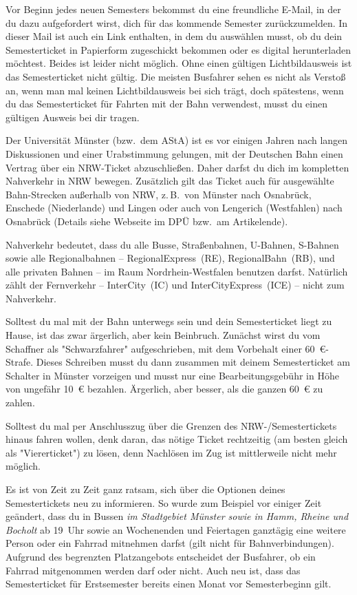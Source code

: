 \begin{multicols*}{2}
Vor Beginn jedes neuen Semesters bekommst du eine freundliche E-Mail, in der du dazu aufgefordert wirst, dich für das kommende Semester zurückzumelden. In dieser Mail ist auch ein Link enthalten, in dem du auswählen musst, ob du dein Semesterticket in Papierform zugeschickt bekommen oder es digital herunterladen möchtest. Beides ist leider nicht möglich.
Ohne einen gültigen Lichtbildausweis ist das Semesterticket nicht gültig.
Die meisten Busfahrer sehen es nicht als Verstoß an, wenn man mal keinen Lichtbildausweis bei sich trägt, doch spätestens, wenn du das Semesterticket für Fahrten mit der Bahn verwendest, musst du einen gültigen Ausweis bei dir tragen.

Der Universität Münster (bzw.\ dem AStA) ist es vor einigen Jahren nach langen Diskussionen und einer Urabstimmung gelungen, mit der Deutschen Bahn einen Vertrag über ein NRW-Ticket abzuschließen.
Daher darfst du dich im kompletten Nahverkehr in NRW bewegen.
Zusätzlich gilt das Ticket auch für ausgewählte Bahn-Strecken außerhalb von NRW, z.\,B.\ von Münster nach Osnabrück, Enschede (Niederlande) und Lingen oder auch von Lengerich (Westfahlen) nach Osnabrück (Details siehe Webseite im DPÜ bzw.\ am Artikelende).

Nahverkehr bedeutet, dass du alle Busse, Straßenbahnen, U-Bahnen, S-Bahnen sowie alle Regionalbahnen -- RegionalExpress~(RE), RegionalBahn~(RB), und alle privaten Bahnen -- im Raum Nordrhein-Westfalen benutzen darfst.
Natürlich zählt der Fernverkehr -- InterCity~(IC) und InterCityExpress~(ICE) -- nicht zum Nahverkehr.

Solltest du mal mit der Bahn unterwegs sein und dein Semesterticket liegt zu Hause, ist das zwar ärgerlich, aber kein Beinbruch.
Zunächst wirst du vom Schaffner als "Schwarzfahrer" aufgeschrieben, mit dem Vorbehalt einer \SI{60}{\euro}-Strafe.
Dieses Schreiben musst du dann zusammen mit deinem Semesterticket am Schalter in Münster vorzeigen und musst nur eine Bearbeitungsgebühr in Höhe von ungefähr \SI{10}{\euro} bezahlen.
Ärgerlich, aber besser, als die ganzen \SI{60}{\euro} zu zahlen.

Solltest du mal per Anschlusszug über die Grenzen des NRW-/Semestertickets hinaus fahren wollen, denk daran, das nötige Ticket rechtzeitig (am besten gleich als "Viererticket") zu lösen, denn Nachlösen im Zug ist mittlerweile nicht mehr möglich.

Es ist von Zeit zu Zeit ganz ratsam, sich über die Optionen deines Semestertickets neu zu informieren.
So wurde zum Beispiel vor einiger Zeit geändert, dass du in Bussen \emph{im Stadtgebiet Münster sowie in Hamm, Rheine und Bocholt} ab 19~Uhr sowie an Wochenenden und Feiertagen ganztägig eine weitere Person oder ein Fahrrad mitnehmen darfst (gilt nicht für Bahnverbindungen).
Aufgrund des begrenzten Platzangebots entscheidet der Busfahrer, ob ein Fahrrad mitgenommen werden darf oder nicht.
Auch neu ist, dass das Semesterticket für Erstsemester bereits einen Monat vor Semesterbeginn gilt.


\end{multicols*}
